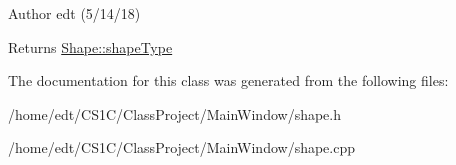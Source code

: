 \begin{DoxyAuthor}{Author}
edt (5/14/18)
\end{DoxyAuthor}
\begin{DoxyReturn}{Returns}
\hyperlink{classShape_aaac58aa2f6760d0f06ec1710d5123e9b}{Shape\-::shape\-Type} 
\end{DoxyReturn}


The documentation for this class was generated from the following files\-:\begin{DoxyCompactItemize}
\item 
/home/edt/\-C\-S1\-C/\-Class\-Project/\-Main\-Window/shape.\-h\item 
/home/edt/\-C\-S1\-C/\-Class\-Project/\-Main\-Window/shape.\-cpp\end{DoxyCompactItemize}
